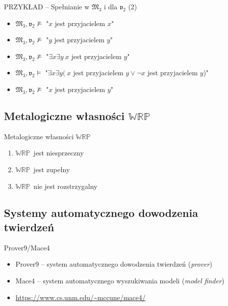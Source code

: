 \documentclass{beamer}
\newcommand {\WRP} {\ensuremath{\mathbb{WRP}}}
\begin{document}
\begin{frame}{PRZYKŁAD -- Spełnianie w $\mathfrak{M}_3$ i dla $\mathfrak{v}_2$ (2)}
%
\begin{itemize}
\item $\mathfrak{M}_3,\mathfrak{v}_2 \not \vDash$ "$x$ jest przyjacielem $x$"%
\item $\mathfrak{M}_3,\mathfrak{v}_2 \not \vDash$ "$y$ jest przyjacielem $y$"%
\item $\mathfrak{M}_3,\mathfrak{v}_2 \not \vDash$ "$\exists x \exists y ~x$ jest przyjacielem $y$"%
\item $\mathfrak{M}_3,\mathfrak{v}_2 \vDash$ "$\exists x \exists y ( ~x$ jest przyjacielem $y \lor \neg x$ jest przyjacielem $y$)"%
\item $\mathfrak{M}_3,\mathfrak{v}_2 \not \vDash$ "$x$ jest przyjacielem $y$"
\end{itemize}
\end{frame}


\subsection{Metalogiczne własności \WRP}

\begin{frame}{Metalogiczne własności \WRP}
    \begin{enumerate}
        \item \WRP\ jest niesprzeczny
        \item \WRP\ jest zupełny
        \item \WRP\ nie jest rozstrzygalny
    \end{enumerate}
\end{frame}

\subsection{Systemy automatycznego dowodzenia twierdzeń}

\begin{frame}{Prover9/Mace4}%
    \begin{itemize}
        \item Prover9 -- system automatycznego dowodzenia twierdzeń (\emph{prover})
        \item Mace4 -- system automatycznego wyszukiwania modeli (\emph{model finder})%
				\item \url{https://www.cs.unm.edu/~mccune/mace4/}
    \end{itemize}
\end{frame}
\end{document}
